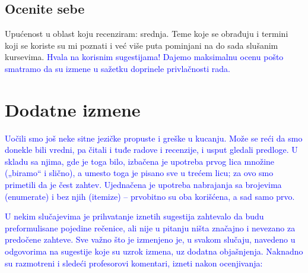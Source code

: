 \documentclass[a4paper]{report}
\newcommand{\odgovor}[1]{\textcolor{blue}{#1}}
\begin{document}
\section{Ocenite sebe}
Upućenost u oblast koju recenziram: srednja. Teme koje se obrađuju i termini koji se koriste su mi poznati i već više puta pominjani na do sada slušanim kursevima. \odgovor{Hvala na korisnim sugestijama! Dajemo maksimalnu ocenu pošto smatramo da su izmene u sažetku doprinele privlačnosti rada.}


\chapter{Dodatne izmene}
\odgovor{Uočili smo još neke sitne jezičke propuste i greške u kucanju. Može se reći da smo donekle bili vredni, pa čitali i tuđe radove i recenzije, i usput gledali predloge. U skladu sa njima, gde je toga bilo, izbačena je upotreba prvog lica množine („biramo“ i slično), a umesto toga je pisano sve u trećem licu; za ovo smo primetili da je čest zahtev. Ujednačena je upotreba nabrajanja sa brojevima (enumerate) i bez njih (itemize) -- prvobitno su oba korišćena, a sad samo prvo.}

\odgovor{U nekim slučajevima je prihvatanje iznetih sugestija zahtevalo da budu preformulisane pojedine rečenice, ali nije u pitanju ništa značajno i nevezano za predočene zahteve. Sve važno što je izmenjeno je, u svakom slučaju, navedeno u odgovorima na sugestije koje su uzrok izmena, uz dodatna objašnjenja. Naknadno su razmotreni i sledeći profesorovi komentari, izneti nakon ocenjivanja:}
\end{document}
